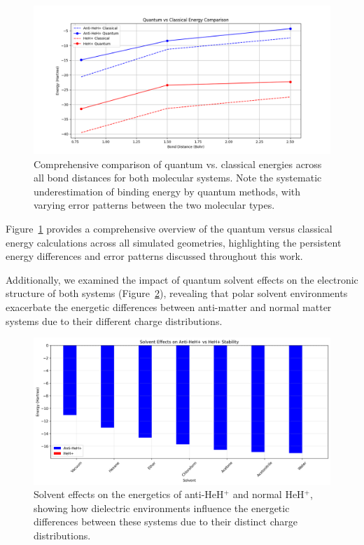 \documentclass[10pt,twocolumn,a4paper]{article}
\begin{document}
\begin{figure}[t!]
    \centering
    \includegraphics[width=\columnwidth]{graphs/quantum_vs_classical_energies.png}
    \caption{Comprehensive comparison of quantum vs. classical energies across all bond distances for both molecular systems. Note the systematic underestimation of binding energy by quantum methods, with varying error patterns between the two molecular types.}
    \label{fig:quantum_vs_classical}
\end{figure}

Figure~\ref{fig:quantum_vs_classical} provides a comprehensive overview of the quantum versus classical energy calculations across all simulated geometries, highlighting the persistent energy differences and error patterns discussed throughout this work.

Additionally, we examined the impact of quantum solvent effects on the electronic structure of both systems (Figure~\ref{fig:solvent_effects}), revealing that polar solvent environments exacerbate the energetic differences between anti-matter and normal matter systems due to their different charge distributions.

\begin{figure}[t!]
    \centering
    \includegraphics[width=\columnwidth]{graphs/corrected_solvent_effects.png}
    \caption{Solvent effects on the energetics of anti-HeH$^+$ and normal HeH$^+$, showing how dielectric environments influence the energetic differences between these systems due to their distinct charge distributions.}
    \label{fig:solvent_effects}
\end{figure}
\end{document}
